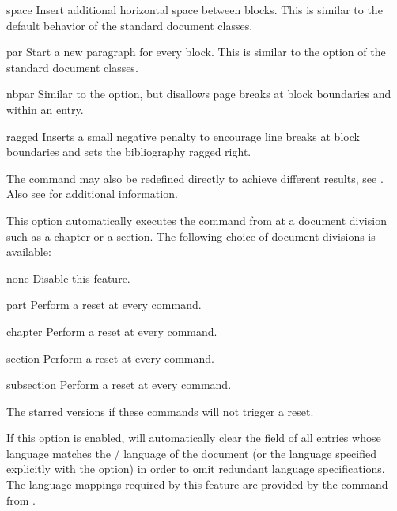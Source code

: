 \documentclass{ltxdockit}[2011/03/25]
\begin{document}
\begin{optionlist}
\begin{valuelist}
\item[space] Insert additional horizontal space between blocks. This is similar to the default behavior of the standard \latex document classes.

\item[par] Start a new paragraph for every block. This is similar to the  option of the standard \latex document classes.

\item[nbpar] Similar to the  option, but disallows page breaks at block boundaries and within an entry.

\item[ragged] Inserts a small negative penalty to encourage line breaks at block boundaries and sets the bibliography ragged right.

\end{valuelist}

The  command may also be redefined directly to achieve different results, see . Also see  for additional information.


This option automatically executes the  command from  at a document division such as a chapter or a section. The following choice of document divisions is available:

\begin{valuelist}
\item[none] Disable this feature.
\item[part] Perform a reset at every  command.
\item[chapter] Perform a reset at every  command.
\item[section] Perform a reset at every  command.
\item[subsection] Perform a reset at every  command.
\end{valuelist}
%
The starred versions if these commands will not trigger a reset.


If this option is enabled,  will automatically clear the  field of all entries whose language matches the / language of the document (or the language specified explicitly with the  option) in order to omit redundant language specifications. The language mappings required by this feature are provided by the  command from .


\end{optionlist}
\end{document}
